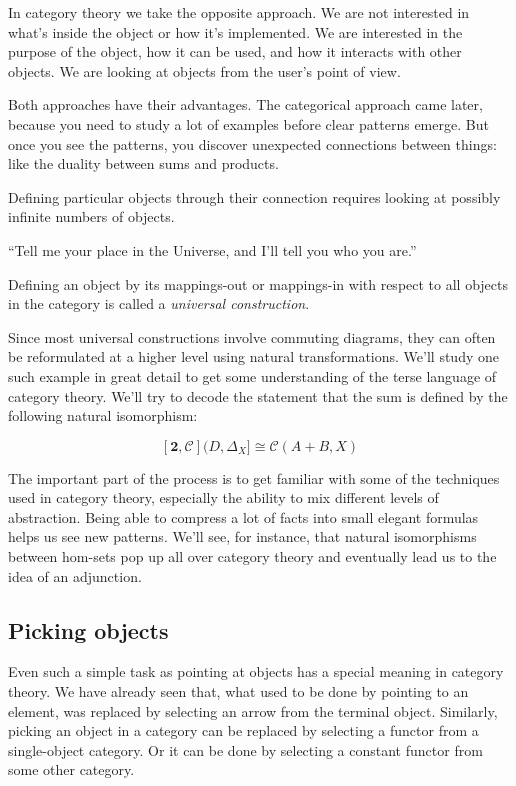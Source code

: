 \documentclass[DaoFP]{subfiles}
\begin{document}
In category theory we take the opposite approach. We are not interested in what's inside the object or how it's implemented. We are interested in the purpose of the object, how it can be used, and how it interacts with other objects. We are looking at objects from the user's point of view.

Both approaches have their advantages. The categorical approach came later, because you need to study a lot of examples before clear patterns emerge. But once you see the patterns, you discover unexpected connections between things: like the duality between sums and products.

Defining particular objects through their connection requires looking at possibly infinite numbers of objects. 

``Tell me your place in the Universe, and I'll tell you who you are.''

Defining an object by its mappings-out or mappings-in with respect to all objects in the category is called a \emph{universal construction}. 

Since most universal constructions involve commuting diagrams, they can often be reformulated at a higher level using natural transformations. We'll study one such example in great detail to get some understanding of the terse language of category theory. We'll try to decode the statement that the sum is defined by the following natural isomorphism:

\[ [\mathbf{2}, \mathcal{C}](D, \Delta_X]  \cong \mathcal{C}(A + B, X) \]

The important part of the process is to get familiar with some of the techniques used in category theory, especially the ability to mix different levels of abstraction. Being able to compress a lot of facts into small elegant formulas helps us see new patterns. We'll see, for instance, that natural isomorphisms between hom-sets pop up all over category theory and eventually lead us to the idea of an adjunction.

\subsection{Picking objects}

Even such a simple task as pointing at objects has a special meaning in category theory. We have already seen that, what used to be done by pointing to an element, was replaced by selecting an arrow from the terminal object. Similarly, picking an object in a category can be replaced by selecting a functor from a single-object category. Or it can be done by selecting a constant functor from some other category. 
\end{document}
